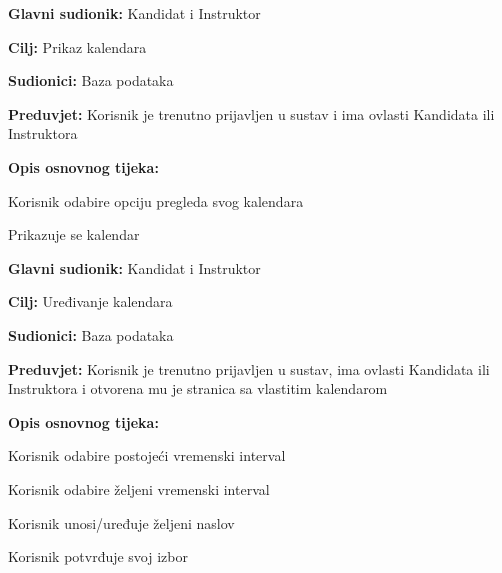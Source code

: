  \noindent {}
	\begin{packed_item}
		
		\item \textbf{Glavni sudionik:} Kandidat i Instruktor
		\item  \textbf{Cilj:} Prikaz kalendara 
		\item  \textbf{Sudionici:} Baza podataka
		\item  \textbf{Preduvjet:} Korisnik je trenutno prijavljen u sustav i ima ovlasti Kandidata ili Instruktora
		\item  \textbf{Opis osnovnog tijeka:}
		
		\item[] \begin{packed_enum}
			
			\item Korisnik odabire opciju pregleda svog kalendara
			\item Prikazuje se kalendar
			
		\end{packed_enum}
		
	\end{packed_item}

  \noindent {}
	\begin{packed_item}
		
		\item \textbf{Glavni sudionik:} Kandidat i Instruktor
		\item  \textbf{Cilj:} Uređivanje kalendara 
		\item  \textbf{Sudionici:} Baza podataka
		\item  \textbf{Preduvjet:} Korisnik je trenutno prijavljen u sustav, ima ovlasti Kandidata ili Instruktora i otvorena mu je stranica sa vlastitim kalendarom
		\item  \textbf{Opis osnovnog tijeka:}
		
		\item[] \begin{packed_enum}
			
			\item[1.a] Korisnik odabire postojeći vremenski interval 
                \item[1.b] Korisnik odabire željeni vremenski interval 
			\item Korisnik unosi/uređuje željeni naslov
                \item Korisnik potvrđuje svoj izbor
			
		\end{packed_enum}
		
	\end{packed_item}


